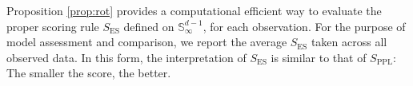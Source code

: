 Proposition \ref{prop:rot} provides a computational efficient way to evaluate the proper
    scoring rule $S_{\text{ES}}$ defined on ${\mathbb S}_\infty^{d-1}$, for each 
    observation. For the purpose of model assessment and comparison, we report the 
    average $S_{\text{ES}}$ taken across all observed data.  In this form, the 
    interpretation of $S_{\text{ES}}$ is similar to that of $S_{\text{PPL}}$: The smaller 
    the score, the better.
    
